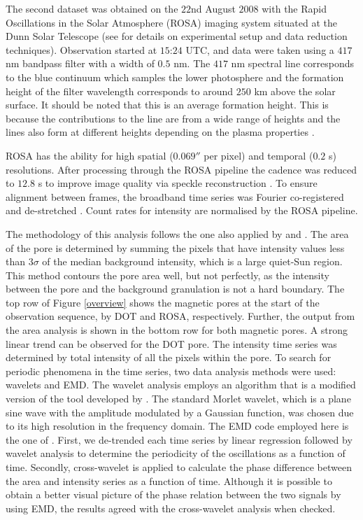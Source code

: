    The second dataset was obtained on the $22$nd August $2008$ with the Rapid Oscillations in the Solar Atmosphere (ROSA) imaging system situated at the Dunn Solar Telescope (see \citealt{jess1} for details on experimental setup and data reduction techniques).
    Observation started at $15$:$24$ UTC, and data were taken using a $417$ nm bandpass filter with a width of $0.5$ nm.
    The $417$ nm spectral line corresponds to the blue continuum which samples the lower photosphere and the formation height of the filter wavelength corresponds to around $250$ km above the solar surface.
    It should be noted that this is an average formation height. 
    This is because the contributions to the line are from a wide range of heights and the lines also form at different heights depending on the plasma properties \citep{gband}.
    
    ROSA has the ability for high spatial ($0.069''$ per pixel) and temporal ($0.2$ s) resolutions.
    After processing through the ROSA pipeline the cadence was reduced to $12.8$ s to improve image quality via speckle reconstruction \citep{20764}.
    To ensure alignment between frames, the broadband time series was Fourier co-registered and de-stretched \citep{2007A&A...473..943J}.
    Count rates for intensity are normalised by the ROSA pipeline.
    
    The methodology of this analysis follows the one also applied by \citet{morton2011} and \cite{Dorotovic2014}.
    The area of the pore is determined by summing the pixels that have intensity values less than $3\sigma$ of the median background intensity, which is a large quiet-Sun region. 
    This method contours the pore area well, but not perfectly, as the intensity between the pore and the background granulation is not a hard boundary.
    The top row of Figure \ref{overview} shows the magnetic pores at the start of the observation sequence, by DOT and ROSA, respectively. 
    Further, the output from the area analysis is shown in the bottom row for both magnetic pores.
    A strong linear trend can be observed for the DOT pore.
    The intensity time series was determined by total intensity of all the pixels within the pore.
    To search for periodic phenomena in the time series, two data analysis methods were used: wavelets and EMD.
    The wavelet analysis employs an algorithm that is a modified version of the tool developed by \citet{torrence}.
    The standard Morlet wavelet, which is a plane sine wave with the amplitude modulated by a Gaussian function, was chosen due to its high resolution in the frequency domain.
    The EMD code employed here is the one of \citet{terradas}.
    First, we de-trended each time series by linear regression followed by wavelet analysis to determine the periodicity of the oscillations as a function of time.
    Secondly, cross-wavelet is applied to calculate the phase difference between the area and intensity series as a function of time.
    Although it is possible to obtain a better visual picture of the phase relation between the two signals by using EMD, the results agreed with the cross-wavelet analysis when checked. 
    
